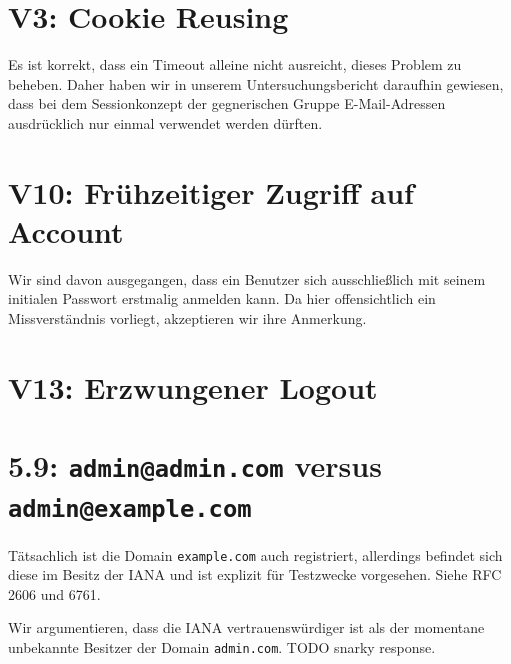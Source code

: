 \documentclass[12pt,DIV14,BCOR10mm,a4paper,parskip=half-,headsepline,headinclude,english,ngerman,bibliography=totocnumbered]{scrreprt}
\begin{document}
\section{V3: Cookie Reusing}

Es ist korrekt, dass ein Timeout alleine nicht ausreicht, dieses Problem zu beheben.
Daher haben wir in unserem Untersuchungsbericht daraufhin gewiesen, dass bei dem Sessionkonzept der gegnerischen Gruppe E-Mail-Adressen ausdrücklich nur einmal verwendet werden dürften.

\section{V10: Frühzeitiger Zugriff auf Account}

Wir sind davon ausgegangen, dass ein Benutzer sich ausschließlich mit seinem initialen Passwort erstmalig anmelden kann.
Da hier offensichtlich ein Missverständnis vorliegt, akzeptieren wir ihre Anmerkung.

\section{V13: Erzwungener Logout}

\section{5.9: \texttt{admin@admin.com} versus \texttt{admin@example.com}}

Tätsachlich ist die Domain \texttt{example.com} auch registriert, allerdings befindet sich diese im Besitz der IANA und ist explizit für Testzwecke vorgesehen.
Siehe RFC 2606 und 6761.

Wir argumentieren, dass die IANA vertrauenswürdiger ist als der momentane unbekannte Besitzer der Domain \texttt{admin.com}.
TODO snarky response.

\printbibliography

\printacronyms[title=Abkürzungsverzeichnis,toctitle=Abkürzungsverzeichnis]
\printglossary[title=Glossar,toctitle=Glossar,type=main]

\iftotalfigures
  \listoffigures
\fi

\end{document}
